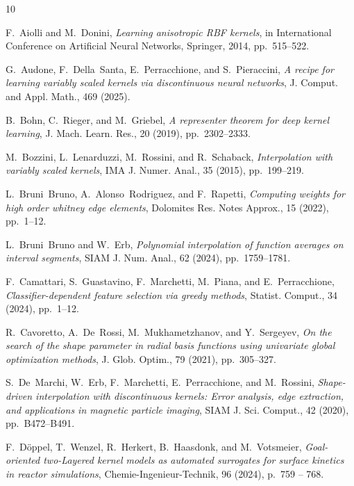 \documentclass[hyphens,a4paper,11pt]{article}
\begin{document}
\begin{thebibliography}{10}

{\sc F.~Aiolli and M.~Donini}, {\em Learning anisotropic {RBF} kernels}, in International Conference on Artificial Neural Networks, Springer, 2014, pp.~515--522.

{\sc G.~Audone, F.~Della~Santa, E.~Perracchione, and S.~Pieraccini}, {\em A recipe for learning variably scaled kernels via discontinuous neural networks}, J. Comput. and Appl. Math., 469 (2025).

{\sc B.~Bohn, C.~Rieger, and M.~Griebel}, {\em A representer theorem for deep kernel learning}, J. Mach. Learn. Res., 20 (2019), pp.~2302--2333.

{\sc M.~Bozzini, L.~Lenarduzzi, M.~Rossini, and R.~Schaback}, {\em Interpolation with variably scaled kernels}, IMA J. Numer. Anal., 35 (2015), pp.~199--219.

{\sc L.~Bruni~Bruno, A.~Alonso~Rodriguez, and F.~Rapetti}, {\em Computing weights for high order whitney edge elements}, Dolomites Res. Notes Approx., 15 (2022), pp.~1--12.

{\sc L.~Bruni~Bruno and W.~Erb}, {\em Polynomial interpolation of function averages on interval segments}, SIAM J. Num. Anal., 62 (2024), pp.~1759--1781.

{\sc F.~Camattari, S.~Guastavino, F.~Marchetti, M.~Piana, and E.~Perracchione}, {\em Classifier-dependent feature selection via greedy methods}, Statist. Comput., 34 (2024), pp.~1--12.

{\sc R.~Cavoretto, A.~De~Rossi, M.~Mukhametzhanov, and Y.~Sergeyev}, {\em On the search of the shape parameter in radial basis functions using univariate global optimization methods}, J. Glob. Optim., 79 (2021), pp.~305--327.

{\sc S.~De~Marchi, W.~Erb, F.~Marchetti, E.~Perracchione, and M.~Rossini}, {\em Shape-driven interpolation with discontinuous kernels: Error analysis, edge extraction, and applications in magnetic particle imaging}, SIAM J. Sci. Comput., 42 (2020), pp.~B472--B491.

{\sc F.~Döppel, T.~Wenzel, R.~Herkert, B.~Haasdonk, and M.~Votsmeier}, {\em Goal-oriented two-{L}ayered kernel models as automated surrogates for surface kinetics in reactor simulations}, Chemie-Ingenieur-Technik, 96 (2024), p.~759 – 768.


\end{thebibliography}
\end{document}
